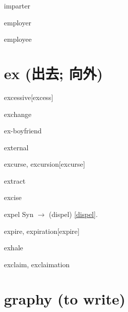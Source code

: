 \begin{RefWord}{imparter}
\end{RefWord}

\begin{RefWord}{employer}
\end{RefWord}

\begin{RefWord}{employee}
\end{RefWord}

\section{ex (出去; 向外)}

\begin{RefWord}{excessive}[excess]
\end{RefWord}

\begin{RefWord}{exchange}
\end{RefWord}

\begin{RefWord}{ex-boyfriend}
\end{RefWord}

\begin{RefWord}{external}
\end{RefWord}

\begin{RefWord}{excurse, excursion}[excurse]
\end{RefWord}

\begin{RefWord}{extract}
\end{RefWord}

\begin{RefWord}{excise}
\end{RefWord}

\begin{RefWord}{expel}
    Syn $\rightarrow$ (dispel) \ref{dispel}.
\end{RefWord}

\begin{RefWord}{expire, expiration}[expire]
\end{RefWord}

\begin{RefWord}{exhale}
\end{RefWord}

\begin{RefWord}{exclaim, exclaimation}
\end{RefWord}

\section{graphy (to write)}

